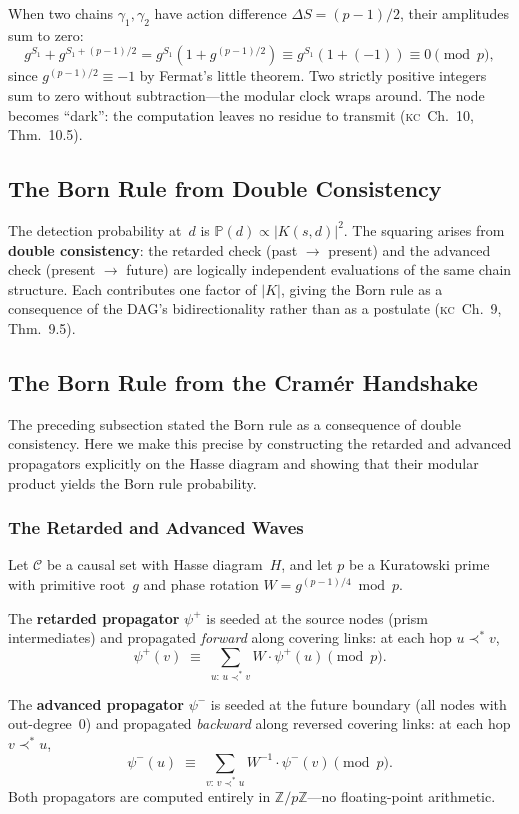 \documentclass[11pt, a4paper, openany]{book}
\newcommand{\covers}{\prec^*}              %
\newcommand{\KC}[1]{\textnormal{(\textsc{kc}~#1)}}
\newcounter{thm}[chapter]
\begin{document}
When two chains $\gamma_1, \gamma_2$ have action difference
$\Delta S = (p-1)/2$, their amplitudes sum to zero:
\[
  g^{S_1} + g^{S_1 + (p-1)/2} = g^{S_1}(1 + g^{(p-1)/2})
  \equiv g^{S_1}(1 + (-1)) \equiv 0 \pmod{p},
\]
since $g^{(p-1)/2} \equiv -1$ by Fermat's little theorem. Two
strictly positive integers sum to zero without subtraction---the
modular clock wraps around. The node becomes ``dark'': the
computation leaves no residue to transmit \KC{Ch.~10, Thm.~10.5}.

\subsection{The Born Rule from Double Consistency}

The detection probability at~$d$ is
$\mathbb{P}(d) \propto |K(s,d)|^2$. The squaring arises from
\textbf{double consistency}: the retarded check (past $\to$ present)
and the advanced check (present $\to$ future) are logically
independent evaluations of the same chain structure. Each contributes
one factor of $|K|$, giving the Born rule as a consequence of the
DAG's bidirectionality rather than as a postulate \KC{Ch.~9, Thm.~9.5}.

\subsection{The Born Rule from the Cram\'er Handshake}
\label{sec:cramer-handshake}

The preceding subsection stated the Born rule as a consequence of
double consistency. Here we make this precise by constructing the
retarded and advanced propagators explicitly on the Hasse diagram and
showing that their modular product yields the Born rule probability.

\subsubsection{The Retarded and Advanced Waves}

\begin{definition}
\label{def:retarded-advanced}
Let $\mathcal{C}$ be a causal set with Hasse diagram~$H$, and let
$p$ be a Kuratowski prime with primitive root~$g$ and phase
rotation $W = g^{(p-1)/4} \bmod p$.

The \textbf{retarded propagator} $\psi^{+}$ is seeded at the
source nodes (prism intermediates) and propagated \emph{forward}
along covering links: at each hop $u \covers v$,
\[
  \psi^{+}(v) \;\equiv\; \sum_{u :\, u \covers v}
  W \cdot \psi^{+}(u) \pmod{p}.
\]

The \textbf{advanced propagator} $\psi^{-}$ is seeded at the
future boundary (all nodes with out-degree~$0$) and propagated
\emph{backward} along reversed covering links: at each hop
$v \covers u$,
\[
  \psi^{-}(u) \;\equiv\; \sum_{v :\, v \covers u}
  W^{-1} \cdot \psi^{-}(v) \pmod{p}.
\]
Both propagators are computed entirely in
$\mathbb{Z}/p\mathbb{Z}$---no floating-point arithmetic.
\end{definition}
\end{document}
